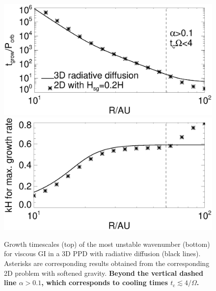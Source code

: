 \begin{figure}
  \includegraphics[width=\linewidth,clip=true,trim=0cm 2cm 0cm
    0.0cm]{figures/ppd_3d_rates}\\
  \includegraphics[width=\linewidth,clip=true,trim=0cm 0cm 0cm
    0.8cm]{figures/ppd_3d_maxk}
  \caption{Growth timescales (top) of the most unstable
    wavenumber (bottom) for viscous GI in a 3D PPD with radiative
    diffusion  (black lines). Asterisks are corresponding results
    obtained from the corresponding 2D problem with softened gravity.   
    {\bf
      Beyond the vertical dashed line $\alpha>0.1$, which corresponds to
      cooling times $t_\mathrm{c}\lesssim 4/\Omega$.  
    }
    \label{rafikov_growth3d}}
\end{figure}



